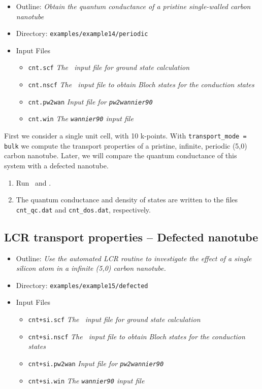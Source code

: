 \documentclass[a4paper,11pt,twoside]{article}
\begin{document}
\begin{itemize}
  \item{Outline: \it{Obtain the quantum conductance of a pristine single-walled carbon nanotube}}
  \item{Directory: {\tt examples/example14/periodic}}
  \item{Input Files}
    \begin{itemize}
      \item{ {\tt cnt.scf}  {\it The \pwscf\ input file for ground state
	  calculation}}
      \item{ {\tt cnt.nscf}  {\it The \pwscf\ input file to obtain Bloch
	  states for the conduction states}} 
      \item{ {\tt cnt.pw2wan}  {\it Input file for {\tt pw2wannier90}}}
      \item{ {\tt cnt.win}  {\it The {\tt wannier90} input file}}
    \end{itemize}
\end{itemize}


First we consider a single unit cell, with 10 k-points. With 
{\tt transport\_mode = bulk} we compute the transport properties 
of a pristine, infinite, periodic (5,0) carbon nanotube. Later, we will 
compare the quantum conductance of this system with a defected
nanotube.

\begin{enumerate}
\item Run \pwscf\ and \wannier.\\ 
\item The quantum conductance and density of states are written to the
files {\tt cnt\_qc.dat} and {\tt cnt\_dos.dat}, respectively.
\end{enumerate}

\subsection*{LCR transport properties -- Defected nanotube}

\begin{itemize}
  \item{Outline: \it{Use the automated LCR routine to investigate the effect of
  a single silicon atom in a infinite (5,0) carbon nanotube.}}
  \item{Directory: {\tt examples/example15/defected}}
  \item{Input Files}
    \begin{itemize}
      \item{ {\tt cnt+si.scf}  {\it The \pwscf\ input file for ground state
	  calculation}}
      \item{ {\tt cnt+si.nscf}  {\it The \pwscf\ input file to obtain Bloch
	  states for the conduction states}} 
      \item{ {\tt cnt+si.pw2wan}  {\it Input file for {\tt pw2wannier90}}}
      \item{ {\tt cnt+si.win}  {\it The {\tt wannier90} input file}}
    \end{itemize}
\end{itemize}
\end{document}
